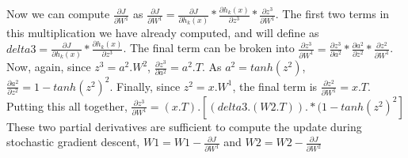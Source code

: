 \documentclass[11pt]{article}
\begin{document}
Now we can compute $\frac{\partial J}{\partial W^{1}}$ as $\frac{\partial J}{\partial W^{1}} = \frac{\partial J}{\partial h_{k}(x)} * \frac{\partial h_{k}(x)}{\partial z^{3}} * \frac{\partial z^{3}}{\partial W^{1}}$.
\newline
The first two terms in this multiplication we have already computed, and will define as $ delta3 = \frac{\partial J}{\partial h_{k}(x)} * \frac{\partial h_{k}(x)}{\partial z^{3}}$. 
\newline
The final term can be broken into $\frac{\partial z^{3}}{\partial W^{1}} = \frac{\partial z^{3}}{\partial a^{2}} * \frac{\partial a^{2}}{\partial z^{2}} * \frac{\partial z^{2}}{\partial W^{1}}$.
\newline
Now, again, since $ z^{3} = a^{2}.W^{2}$,  $\frac{\partial z^{3}}{\partial a^{2}} = a^{2}.T$. 
\newline
As $ a^{2} =  tanh(z^{2}) $, $\frac{\partial a^{2}}{\partial z^{2}} = 1 - tanh(z^{2})^{2}$.
\newline
Finally, since 
$ z^{2} = x.W^{1} $, the final term is $\frac{\partial z^{2}}{\partial W^{1}} = x.T$.
\newline
Putting this all together, $\frac{\partial z^{3}}{\partial W^{1}} = (x.T) . [(delta3 . (W2.T)) .* (1 - tanh(z^{2})^{2}] $
\newline
These two partial derivatives are sufficient to compute the update during stochastic gradient descent, $ W1 = W1 - \frac{\partial J}{\partial W^{1}}$ and $ W2 = W2 - \frac{\partial J}{\partial W^{2}}$

\newpage
\end{document}
